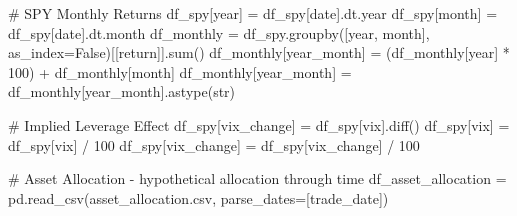 \documentclass[
  letterpaper,
  DIV=11,
  numbers=noendperiod]{scrreprt}
\newenvironment{Shaded}{\begin{snugshade}}{\end{snugshade}}
\newcommand{\BuiltInTok}[1]{\textcolor[rgb]{0.00,0.23,0.31}{#1}}
\newcommand{\CommentTok}[1]{\textcolor[rgb]{0.37,0.37,0.37}{#1}}
\newcommand{\DecValTok}[1]{\textcolor[rgb]{0.68,0.00,0.00}{#1}}
\newcommand{\NormalTok}[1]{\textcolor[rgb]{0.00,0.23,0.31}{#1}}
\newcommand{\OperatorTok}[1]{\textcolor[rgb]{0.37,0.37,0.37}{#1}}
\newcommand{\StringTok}[1]{\textcolor[rgb]{0.13,0.47,0.30}{#1}}
\newcommand{\VariableTok}[1]{\textcolor[rgb]{0.07,0.07,0.07}{#1}}
\begin{document}
\begin{Shaded}
\begin{Highlighting}[]
\CommentTok{\# SPY Monthly Returns}
\NormalTok{df\_spy[}\StringTok{\textquotesingle{}year\textquotesingle{}}\NormalTok{] }\OperatorTok{=}\NormalTok{ df\_spy[}\StringTok{\textquotesingle{}date\textquotesingle{}}\NormalTok{].dt.year}
\NormalTok{df\_spy[}\StringTok{\textquotesingle{}month\textquotesingle{}}\NormalTok{] }\OperatorTok{=}\NormalTok{ df\_spy[}\StringTok{\textquotesingle{}date\textquotesingle{}}\NormalTok{].dt.month}
\NormalTok{df\_monthly }\OperatorTok{=}\NormalTok{ df\_spy.groupby([}\StringTok{\textquotesingle{}year\textquotesingle{}}\NormalTok{, }\StringTok{\textquotesingle{}month\textquotesingle{}}\NormalTok{], as\_index}\OperatorTok{=}\VariableTok{False}\NormalTok{)[[}\StringTok{\textquotesingle{}return\textquotesingle{}}\NormalTok{]].}\BuiltInTok{sum}\NormalTok{()}
\NormalTok{df\_monthly[}\StringTok{\textquotesingle{}year\_month\textquotesingle{}}\NormalTok{] }\OperatorTok{=}\NormalTok{ (df\_monthly[}\StringTok{\textquotesingle{}year\textquotesingle{}}\NormalTok{] }\OperatorTok{*} \DecValTok{100}\NormalTok{) }\OperatorTok{+}\NormalTok{ df\_monthly[}\StringTok{\textquotesingle{}month\textquotesingle{}}\NormalTok{]}
\NormalTok{df\_monthly[}\StringTok{\textquotesingle{}year\_month\textquotesingle{}}\NormalTok{] }\OperatorTok{=}\NormalTok{ df\_monthly[}\StringTok{\textquotesingle{}year\_month\textquotesingle{}}\NormalTok{].astype(}\BuiltInTok{str}\NormalTok{)}

\CommentTok{\# Implied Leverage Effect}
\NormalTok{df\_spy[}\StringTok{\textquotesingle{}vix\_change\textquotesingle{}}\NormalTok{] }\OperatorTok{=}\NormalTok{ df\_spy[}\StringTok{\textquotesingle{}vix\textquotesingle{}}\NormalTok{].diff()}
\NormalTok{df\_spy[}\StringTok{\textquotesingle{}vix\textquotesingle{}}\NormalTok{] }\OperatorTok{=}\NormalTok{ df\_spy[}\StringTok{\textquotesingle{}vix\textquotesingle{}}\NormalTok{] }\OperatorTok{/} \DecValTok{100}
\NormalTok{df\_spy[}\StringTok{\textquotesingle{}vix\_change\textquotesingle{}}\NormalTok{] }\OperatorTok{=}\NormalTok{ df\_spy[}\StringTok{\textquotesingle{}vix\_change\textquotesingle{}}\NormalTok{] }\OperatorTok{/} \DecValTok{100}

\CommentTok{\# Asset Allocation {-} hypothetical allocation through time}
\NormalTok{df\_asset\_allocation }\OperatorTok{=}\NormalTok{ pd.read\_csv(}\StringTok{\textquotesingle{}asset\_allocation.csv\textquotesingle{}}\NormalTok{, parse\_dates}\OperatorTok{=}\NormalTok{[}\StringTok{\textquotesingle{}trade\_date\textquotesingle{}}\NormalTok{])}
\end{Highlighting}
\end{Shaded}
\end{document}
